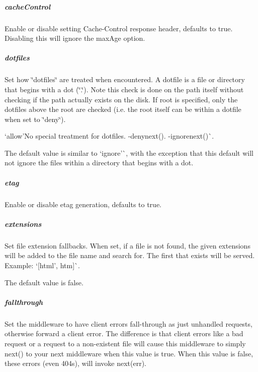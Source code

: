 \subparagraph*{cache\+Control}

Enable or disable setting {\ttfamily Cache-\/\+Control} response header, defaults to true. Disabling this will ignore the {\ttfamily max\+Age} option.

\subparagraph*{dotfiles}

Set how \char`\"{}dotfiles\char`\"{} are treated when encountered. A dotfile is a file or directory that begins with a dot (\char`\"{}.\char`\"{}). Note this check is done on the path itself without checking if the path actually exists on the disk. If {\ttfamily root} is specified, only the dotfiles above the root are checked (i.\+e. the root itself can be within a dotfile when set to \char`\"{}deny\char`\"{}).


\begin{DoxyItemize}
\item `\textquotesingle{}allow'{\ttfamily No special treatment for dotfiles. -\/}\textquotesingle{}denynext(){\ttfamily . -\/}\textquotesingle{}ignorenext()\`{}.
\end{DoxyItemize}

The default value is similar to `\textquotesingle{}ignore'\`{}, with the exception that this default will not ignore the files within a directory that begins with a dot.

\subparagraph*{etag}

Enable or disable etag generation, defaults to true.

\subparagraph*{extensions}

Set file extension fallbacks. When set, if a file is not found, the given extensions will be added to the file name and search for. The first that exists will be served. Example\+: `\mbox{[}\textquotesingle{}html', \textquotesingle{}htm\textquotesingle{}\mbox{]}\`{}.

The default value is {\ttfamily false}.

\subparagraph*{fallthrough}

Set the middleware to have client errors fall-\/through as just unhandled requests, otherwise forward a client error. The difference is that client errors like a bad request or a request to a non-\/existent file will cause this middleware to simply {\ttfamily next()} to your next middleware when this value is {\ttfamily true}. When this value is {\ttfamily false}, these errors (even 404s), will invoke {\ttfamily next(err)}.

